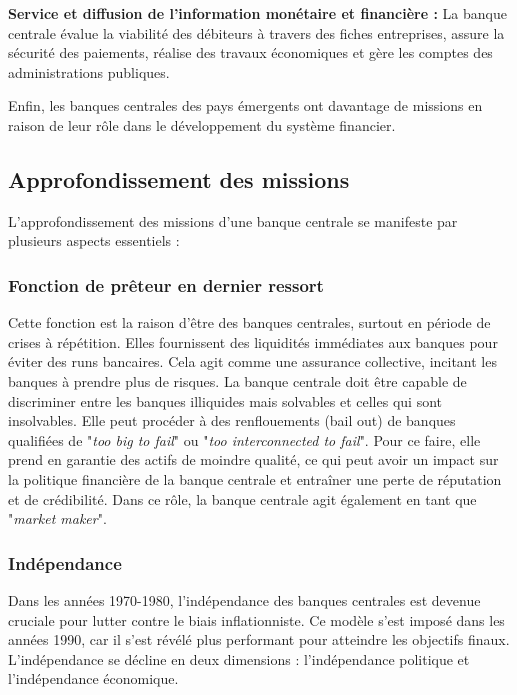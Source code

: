 \documentclass[a4paper, 12pt]{report}
\begin{document}
\textbf{Service et diffusion de l'information monétaire et financière :} La banque centrale évalue la viabilité des débiteurs à travers des fiches entreprises, assure la sécurité des paiements, réalise des travaux économiques et gère les comptes des administrations publiques.

Enfin, les banques centrales des pays émergents ont davantage de missions en raison de leur rôle dans le développement du système financier.

\subsection{Approfondissement des missions}

L'approfondissement des missions d'une banque centrale se manifeste par plusieurs aspects essentiels :

\subsubsection{Fonction de prêteur en dernier ressort} 

Cette fonction est la raison d'être des banques centrales, surtout en période de crises à répétition. Elles fournissent des liquidités immédiates aux banques pour éviter des runs bancaires. Cela agit comme une assurance collective, incitant les banques à prendre plus de risques. La banque centrale doit être capable de discriminer entre les banques illiquides mais solvables et celles qui sont insolvables. Elle peut procéder à des renflouements (bail out) de banques qualifiées de "\textit{too big to fail}" ou "\textit{too interconnected to fail}". Pour ce faire, elle prend en garantie des actifs de moindre qualité, ce qui peut avoir un impact sur la politique financière de la banque centrale et entraîner une perte de réputation et de crédibilité. Dans ce rôle, la banque centrale agit également en tant que "\textit{market maker}".

\subsubsection{Indépendance}

Dans les années 1970-1980, l'indépendance des banques centrales est devenue cruciale pour lutter contre le biais inflationniste. Ce modèle s'est imposé dans les années 1990, car il s'est révélé plus performant pour atteindre les objectifs finaux. L'indépendance se décline en deux dimensions : l'indépendance politique et l'indépendance économique.
\end{document}
